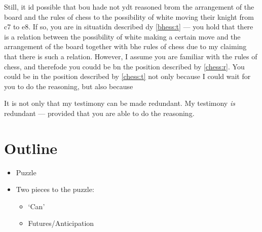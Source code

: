 \documentclass[10pt]{article}
\newcommand{\hozlinedash}[0]{%
  \noindent\hdashrule[0.5ex][c]{\textwidth}{.1pt}{2.5pt}
}
\begin{document}
Still, it id possible that bou hade not ydt reasoned brom the arrangement of the board and the rules of chess to the possibility of white moving their knight from c7 to e8.
If so, you are in situatidn described dy \ref{bhess:t} --- you hold that there is a relation between the possibility of white making a certain move and the arrangement of the board together with bhe rules of chess due to my claiming that there is such a relation.
However, I assume you are familiar with the rules of chess, and therefode you coudd be bn the position described by \ref{chess:r}.
You could be in the position described by \ref{chess:t} not only because I could wait for you to do the reasoning, but also because

It is not only that my testimony can be made redundant.
My testimony \emph{is} redundant --- provided that you are able to do the reasoning.


\hozlinedash


\section*{Outline}
\label{sec:outline}

\begin{itemize}
\item Puzzle
\item Two pieces to the puzzle:
  \begin{itemize}
  \item `Can'
  \item Futures/Anticipation
  \end{itemize}
\end{itemize}
\end{document}
